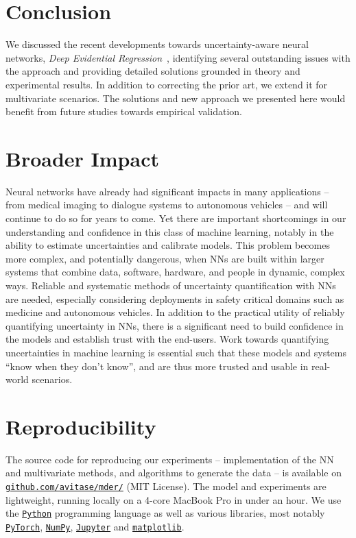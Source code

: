 \documentclass{article}
\begin{document}
\section{Conclusion}
We discussed the recent developments towards uncertainty-aware neural networks, \textit{Deep Evidential Regression}~\cite{amini20}, identifying several outstanding issues with the approach and providing detailed solutions grounded in theory and experimental results.
In addition to correcting the prior art, we extend it for multivariate scenarios.
The solutions and new approach we presented here would benefit from future studies towards empirical validation.

\section*{Broader Impact}
Neural networks have already had significant impacts in many applications -- from medical imaging to dialogue systems to autonomous vehicles -- and will continue to do so for years to come.
Yet there are important shortcomings in our understanding and confidence in this class of machine learning, notably in the ability to estimate uncertainties and calibrate models.
This problem becomes more complex, and potentially dangerous, when NNs are built within larger systems that combine data, software, hardware, and people in dynamic, complex ways.
Reliable and systematic methods of uncertainty quantification with NNs are needed, especially considering deployments in safety critical domains such as medicine and autonomous vehicles.
In addition to the practical utility of reliably quantifying uncertainty in NNs, there is a significant need to build confidence in the models and establish trust with the end-users.
Work towards quantifying uncertainties in machine learning is essential such that these models and systems ``know when they don't know'', and are thus more trusted and usable in real-world scenarios.

\section*{Reproducibility}
The source code for reproducing our experiments -- implementation of the NN and multivariate methods, and algorithms to generate the data -- is available on \href{https://github.com/avitase/mder/}{\texttt{github.com/avitase/mder/}} (MIT License).
The model and experiments are lightweight, running locally on a 4-core MacBook Pro in under an hour.
We use the \href{https://www.python.org/}{\texttt{Python}} programming language as well as various libraries, most notably \href{https://pytorch.org/}{\texttt{PyTorch}}, \href{https://numpy.org/}{\texttt{NumPy}}, \href{https://jupyter.org/}{\texttt{Jupyter}} and \href{https://matplotlib.org/}{\texttt{matplotlib}}.
\end{document}
